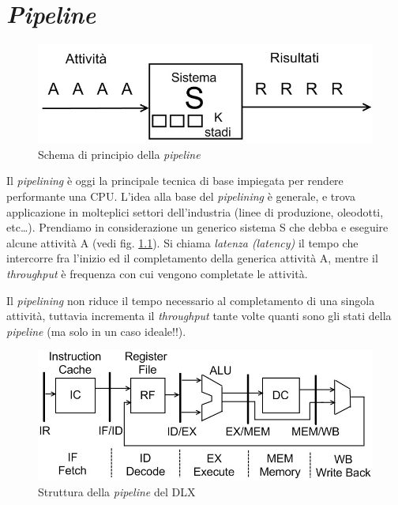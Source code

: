 \chapter{\textit{Pipeline}}
\label{cha:pipeline}

\begin{figure}[!h]
\centering
\includegraphics[width=0.5\columnwidth]{img/principioPipeline}
\caption{Schema di principio della \textit{pipeline}}
\label{fig:principioPipeline}
\end{figure}

Il \textit{pipelining} è oggi la principale tecnica di base impiegata per rendere performante una CPU. L'idea alla base del \textit{pipelining} è generale, e trova applicazione in molteplici settori dell'industria (linee di produzione, oleodotti, etc\ldots). Prendiamo in considerazione un generico sistema S che debba e eseguire alcune attività A (vedi fig. \ref{fig:principioPipeline}). Si chiama \textit{latenza (latency)} il tempo che intercorre fra l'inizio ed il completamento della generica attività A, mentre il \textit{throughput} è frequenza con cui vengono completate le attività.

Il \textit{pipelining} non riduce il tempo necessario al completamento di una singola attività, tuttavia incrementa il \textit{throughput} tante volte quanti sono gli stati della \textit{pipeline} (ma solo in un caso ideale!!).

\begin{figure}[!h]
\centering
\includegraphics[width=0.7\columnwidth]{img/pipeline}
\caption{Struttura della \textit{pipeline} del DLX}
\label{fig:pipelineDLX}
\end{figure}

